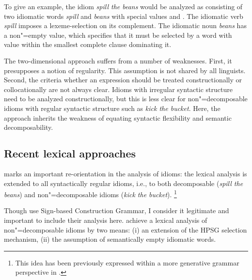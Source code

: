 \documentclass[output=paper]{langsci/langscibook}
\begin{document}
To give an example, the idiom \emph{spill the beans} would be analyzed as consisting of two  idiomatic words \emph{spill} and \emph{beans} with special  values  and . The idiomatic verb \emph{spill} imposes a lexeme-selection on its complement. The idiomatic noun \emph{beans} has a non"=empty  value, which specifies that it must be selected by a word with  value  within the smallest complete clause dominating it.


The two-dimensional approach suffers from a number of weaknesses. 
First, it presupposes a notion of regularity. This assumption is not shared by all linguists.
Second, the criteria whether an expression should be treated constructionally or collocationally are not always clear. Idioms with irregular syntactic structure need to be analyzed constructionally, but this is less clear for non"=decomposable idioms with regular syntactic structure such as \emph{kick the bucket}.
Here, the approach inherits the weakness of \cite{WSN84a-u} equating syntactic flexibility and semantic decomposability.


\subsection{Recent lexical approaches}
\label{Sec-RecentLexical}

\cite{KSF2015a} marks an important re-orientation in the analysis of idioms: the lexical analysis is extended to all syntactically regular idioms, i.e., to both decomposable (\emph{spill the beans}) and non"=decomposable idioms (\emph{kick the bucket}).%
\footnote{This idea has been previously expressed within a more generative grammar perspective in \cite{Everaert:10}. 
}

Though \cite{KSF2015a} use Sign-based Construction Grammar, I consider it legitimate and important to include their analysis here.
%
\cite{KSF2015a} achieve a lexical analysis of non"=decomposable idioms by two means: (i) an extension of the HPSG selection mechanism, (ii) the assumption of semantically empty idiomatic words. 
\end{document}

